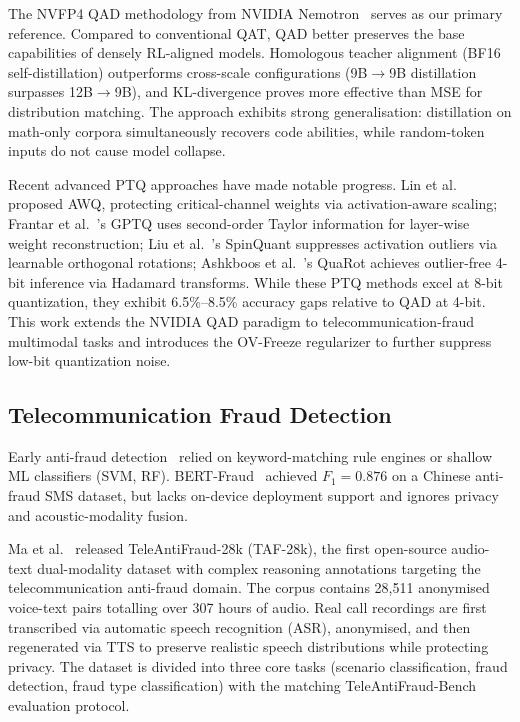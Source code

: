 \documentclass[11pt, a4paper]{article}
\begin{document}
The NVFP4 QAD methodology from NVIDIA Nemotron~\cite{3} serves as our primary reference. Compared to conventional QAT, QAD better preserves the base capabilities of densely RL-aligned models. Homologous teacher alignment (BF16 self-distillation) outperforms cross-scale configurations (9B$\rightarrow$9B distillation surpasses 12B$\rightarrow$9B), and KL-divergence proves more effective than MSE for distribution matching. The approach exhibits strong generalisation: distillation on math-only corpora simultaneously recovers code abilities, while random-token inputs do not cause model collapse.

Recent advanced PTQ approaches have made notable progress. Lin et al.~\cite{9} proposed AWQ, protecting critical-channel weights via activation-aware scaling; Frantar et al.~\cite{10}'s GPTQ uses second-order Taylor information for layer-wise weight reconstruction; Liu et al.~\cite{11}'s SpinQuant suppresses activation outliers via learnable orthogonal rotations; Ashkboos et al.~\cite{12}'s QuaRot achieves outlier-free 4-bit inference via Hadamard transforms. While these PTQ methods excel at 8-bit quantization, they exhibit 6.5\%--8.5\% accuracy gaps relative to QAD at 4-bit. This work extends the NVIDIA QAD paradigm to telecommunication-fraud multimodal tasks and introduces the OV-Freeze regularizer to further suppress low-bit quantization noise.

\subsection{Telecommunication Fraud Detection}

Early anti-fraud detection~\cite{13,14,15} relied on keyword-matching rule engines or shallow ML classifiers (SVM, RF). BERT-Fraud~\cite{16} achieved $F_1 = 0.876$ on a Chinese anti-fraud SMS dataset, but lacks on-device deployment support and ignores privacy and acoustic-modality fusion.

Ma et al.~\cite{1} released TeleAntiFraud-28k (TAF-28k), the first open-source audio-text dual-modality dataset with complex reasoning annotations targeting the telecommunication anti-fraud domain. The corpus contains 28{,}511 anonymised voice-text pairs totalling over 307 hours of audio. Real call recordings are first transcribed via automatic speech recognition (ASR), anonymised, and then regenerated via TTS to preserve realistic speech distributions while protecting privacy. The dataset is divided into three core tasks (scenario classification, fraud detection, fraud type classification) with the matching TeleAntiFraud-Bench evaluation protocol.
\end{document}

